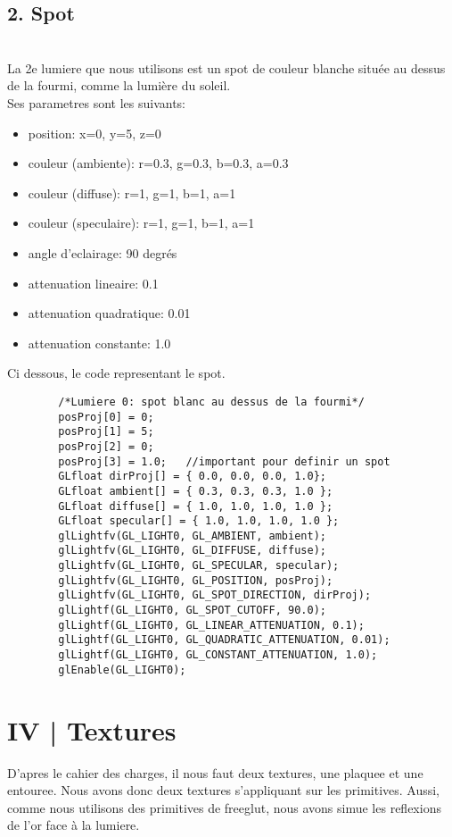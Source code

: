 \documentclass[11pt]{article}
\begin{document}
    \subsection*{2. Spot}
    \\
    La 2e lumiere que nous utilisons est un spot de couleur blanche située au dessus de la fourmi, comme la lumière du soleil. 
    \\
    Ses parametres sont les suivants:
    \begin{itemize}
        \item position: x=0, y=5, z=0
        \item couleur (ambiente): r=0.3, g=0.3, b=0.3, a=0.3
        \item couleur (diffuse): r=1, g=1, b=1, a=1
        \item couleur (speculaire): r=1, g=1, b=1, a=1
        \item angle d'eclairage: 90 degrés
        \item attenuation lineaire: 0.1
        \item attenuation quadratique: 0.01
        \item attenuation constante: 1.0
    \end{itemize}
    Ci dessous, le code representant le spot.
    \begin{lstlisting}
        /*Lumiere 0: spot blanc au dessus de la fourmi*/
        posProj[0] = 0;
        posProj[1] = 5;
        posProj[2] = 0;
        posProj[3] = 1.0;   //important pour definir un spot
        GLfloat dirProj[] = { 0.0, 0.0, 0.0, 1.0};
        GLfloat ambient[] = { 0.3, 0.3, 0.3, 1.0 };
        GLfloat diffuse[] = { 1.0, 1.0, 1.0, 1.0 };
        GLfloat specular[] = { 1.0, 1.0, 1.0, 1.0 };
        glLightfv(GL_LIGHT0, GL_AMBIENT, ambient);
        glLightfv(GL_LIGHT0, GL_DIFFUSE, diffuse);
        glLightfv(GL_LIGHT0, GL_SPECULAR, specular);
        glLightfv(GL_LIGHT0, GL_POSITION, posProj);
        glLightfv(GL_LIGHT0, GL_SPOT_DIRECTION, dirProj);
        glLightf(GL_LIGHT0, GL_SPOT_CUTOFF, 90.0);
        glLightf(GL_LIGHT0, GL_LINEAR_ATTENUATION, 0.1);
        glLightf(GL_LIGHT0, GL_QUADRATIC_ATTENUATION, 0.01);
        glLightf(GL_LIGHT0, GL_CONSTANT_ATTENUATION, 1.0);
        glEnable(GL_LIGHT0);
    \end{lstlisting}
    
    \vspace{\baselineskip}
    
    \newpage
\fancyhf{}
    \section*{IV | Textures}
    D'apres le cahier des charges, il nous faut deux textures, une plaquee et une entouree. Nous avons donc deux textures s'appliquant sur les primitives. Aussi, comme nous utilisons des primitives de freeglut, nous avons simue les reflexions de l'or face à la lumiere.
    
\end{document}
